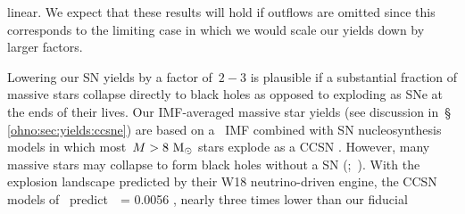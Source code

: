 linear.
We expect that these results will hold if outflows are omitted since this
corresponds to the limiting case in which we would scale our yields down by
larger factors.
\par
Lowering our SN yields by a factor of~$2 - 3$ is plausible if a substantial
fraction of massive stars collapse directly to black holes as opposed to
exploding as SNe at the ends of their lives.
Our IMF-averaged massive star yields (see discussion in~\S
\ref{ohno:sec:yields:ccsne}) are based on a~\citet{Kroupa2001} IMF combined with SN
nucleosynthesis models in which most~$M > 8~\text{M}_\odot$ stars explode as a CCSN
\cite[e.g.][]{Woosley1995, Chieffi2004, Chieffi2013, Limongi2018, Nomoto2013}.
However, many massive stars may collapse to form black holes without a SN
(\citealp*{Pejcha2015, Gerke2015};~\citealp{Sukhbold2016, Ertl2016, Adams2017,
Basinger2021, Neustadt2021}).
With the explosion landscape predicted by their W18 neutrino-driven engine, the
CCSN models of~\citet{Sukhbold2016} predict~~= 0.0056
\citep{Griffith2021b}, nearly three times lower than our fiducial
